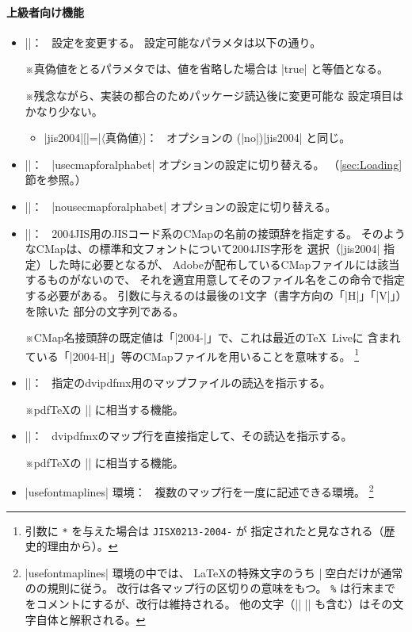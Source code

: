 \documentclass[uplatex,dvipdfmx,a4paper]{jsarticle}
\newcommand{\Meta}[1]{$\langle$\mbox{}#1\mbox{}$\rangle$}
\newcommand{\Note}{\par\noindent ※}
\newcommand{\Means}{：\ }
\begin{document}
\paragraph{上級者向け機能}
\begin{itemize}
\item |\pxchfonsetup{|\Meta{設定}|,…}|\Means
  設定を変更する。
  設定可能なパラメタは以下の通り。
  \Note 真偽値をとるパラメタでは、値を省略した場合は |true|
  と等価となる。
  \Note 残念ながら、実装の都合のためパッケージ読込後に変更可能な
  設定項目はかなり少ない。
  \begin{itemize}
  \item |jis2004|[|=|\Meta{真偽値}]\Means
    オプションの (|no|)|jis2004| と同じ。
  \end{itemize}
\item |\usecmapforalphabet|\Means
  |usecmapforalphabet| オプションの設定に切り替える。
  （\ref{sec:Loading}節を参照。）
\item |\nousecmapforalphabet|\Means
  |nousecmapforalphabet| オプションの設定に切り替える。
\item |\setnewglyphcmapprefix{|\Meta{文字列}|}|\Means
  2004JIS用のJISコード系のCMapの名前の接頭辞を指定する。
  そのようなCMapは、{\pTeX}の標準和文フォントについて2004JIS字形を
  選択（|jis2004| 指定）した時に必要となるが、
  Adobeが配布しているCMapファイルには該当するものがないので、
  それを適宜用意してそのファイル名をこの命令で指定する必要がある。
  引数に与えるのは最後の1文字（書字方向の「|H|」「|V|」）を除いた
  部分の文字列である。
  \Note CMap名接頭辞の既定値は「|2004-|」で、これは最近の{\TeX}~Liveに
  含まれている「|2004-H|」等のCMapファイルを用いることを意味する。%
  \footnote{%
    引数に \texttt{*} を与えた場合は \texttt{JISX0213-2004-} が
    指定されたと見なされる（歴史的理由から）。}
\item |\usefontmapfile{|\Meta{マップファイル名}|}|\Means
  指定のdvipdfmx用のマップファイルの読込を指示する。
  \Note pdf{\TeX}の |\pdfmapfile| に相当する機能。
\item |\usefontmapline{|\Meta{マップ行}|}|\Means
  dvipdfmxのマップ行を直接指定して、その読込を指示する。
  \Note pdf{\TeX}の |\pdfmapline| に相当する機能。
\item |usefontmaplines| 環境\Means
  複数のマップ行を一度に記述できる環境。
  \footnote{|usefontmaplines| 環境の中では、
    {\LaTeX}の特殊文字のうち |\| と空白だけが通常のの規則に従う。
    改行は各マップ行の区切りの意味をもつ。
    \texttt{\%} は行末までをコメントにするが、改行は維持される。
    他の文字（|{| |}| も含む）はその文字自体と解釈される。
}
\end{itemize}
\end{document}

